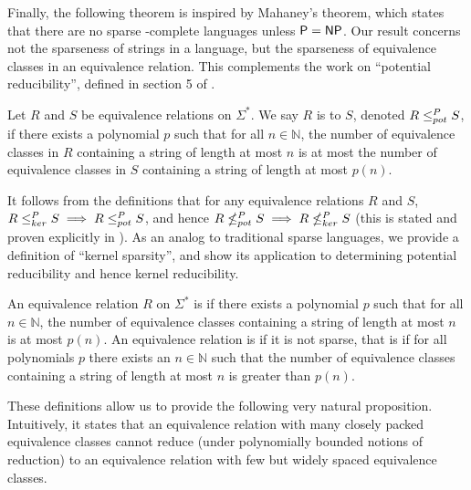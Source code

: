 Finally, the following theorem is inspired by Mahaney's theorem, which states that there are no sparse \NP-complete languages unless ${\mathsf{P}}={\mathsf{NP}}$.
Our result concerns not the sparseness of strings in a language, but the sparseness of equivalence classes in an equivalence relation.
This complements the work on ``potential reducibility'', defined in section 5 of \cite{bcffm}.

\begin{definition}
  Let $R$ and $S$ be equivalence relations on $\Sigma^*$.
  We say $R$ is  to $S$, denoted $R\leq^{P}_{pot} S$, if there exists a polynomial $p$ such that for all $n\in\mathbb{N}$, the number of equivalence classes in $R$ containing a string of length at most $n$ is at most the number of equivalence classes in $S$ containing a string of length at most $p(n)$.
\end{definition}

It follows from the definitions that for any equivalence relations $R$ and $S$, $R\leq^{P}_{ker} S\implies R\leq^{P}_{pot} S$, and hence $R\nleq^{P}_{pot} S \implies R\nleq^{P}_{ker} S$ (this is stated and proven explicitly in \cite[Lemma~5.5]{bcffm}).
As an analog to traditional sparse languages, we provide a definition of ``kernel sparsity'', and show its application to determining potential reducibility and hence kernel reducibility.

\begin{definition}
  An equivalence relation $R$ on $\Sigma^*$ is  if there exists a polynomial $p$ such that for all $n\in\mathbb{N}$, the number of equivalence classes containing a string of length at most $n$ is at most $p(n)$.
  An equivalence relation is  if it is not sparse, that is if for all polynomials $p$ there exists an $n\in\mathbb{N}$ such that the number of equivalence classes containing a string of length at most $n$ is greater than $p(n)$.
\end{definition}

These definitions allow us to provide the following very natural proposition.
Intuitively, it states that an equivalence relation with many closely packed equivalence classes cannot reduce (under polynomially bounded notions of reduction) to an equivalence relation with few but widely spaced equivalence classes.

